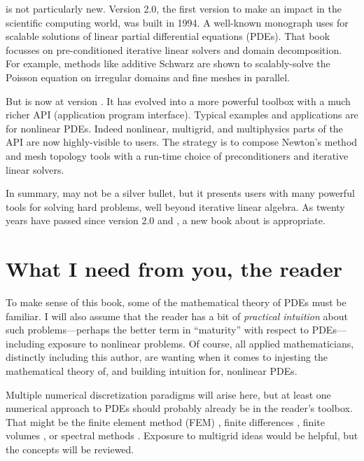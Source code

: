 \PETSc is not particularly new.  Version 2.0, the first version to make an impact in the scientific computing world, was built in 1994.  A well-known monograph \citet{Smithetal1996} uses  for scalable solutions of linear partial differential equations (PDEs).  That book focusses on pre-conditioned iterative linear solvers and domain decomposition.  For example, methods like additive Schwarz are shown to scalably-solve the Poisson equation on irregular domains and fine meshes in parallel.

But \PETSc is now at version \PETSCVERSION.  It has evolved into a more powerful toolbox with a much richer API (application program interface).  Typical examples and applications are for nonlinear PDEs.  Indeed nonlinear, multigrid, and multiphysics parts of the API are now highly-visible to users.  The \PETSc strategy is to compose Newton's method and mesh topology tools with a run-time choice of preconditioners and iterative linear solvers.

In summary, \PETSc may not be a silver bullet, but it presents users with many powerful tools for solving hard problems, well beyond iterative linear algebra.  As twenty years have passed since version 2.0 and \citet{Smithetal1996}, a new book about \PETSc is appropriate.


\section{What I need from you, the reader}

To make sense of this book, some of the mathematical theory of PDEs must be familiar.  I will also assume that the reader has a bit of \emph{practical intuition} about such problems---perhaps the better term in ``maturity'' with respect to PDEs---including exposure to nonlinear problems.  Of course, all applied mathematicians, distinctly including this author, are wanting when it comes to injesting the mathematical theory of, and building intuition for, nonlinear PDEs.

Multiple numerical discretization paradigms will arise here, but at least one numerical approach to PDEs should probably already be in the reader's toolbox.  That might be the finite element method (FEM) \citep{Braess,Elmanetal2005}, finite differences \citep{MortonMayers}, finite volumes \citep{LeVeque}, or spectral methods \citep{KarniadakisSherwin,Trefethen}.  Exposure to multigrid ideas \citep{Briggsetal2000} would be helpful, but the concepts will be reviewed.


